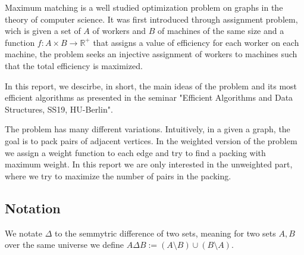 Maximum matching is a well studied optimization problem on graphs in the theory of computer science. It was first introduced through assignment problem, wich is given a set of $A$ of workers and $B$ of machines of the same size and a function $f:A\times B \rightarrow \mathbb{R}^{+}$ that assigns a value of efficiency for each worker on each machine, the problem seeks an injective assignment of workers to machines such that the total efficiency is maximized.

In this report, we descirbe, in short, the main ideas of the problem and its most efficient algorithms as presented in the seminar "Efficient Algorithms and Data Structures, SS19, HU-Berlin".

The problem has many different variations. Intuitively, in a given a graph, the goal is to pack pairs of adjacent vertices. In the weighted version of the problem we assign a weight function to each edge and try to find a packing with maximum weight. In this report we are only interested in the unweighted part, where we try to maximize the number of pairs in the packing.

\subsection{Notation}
We notate $\Delta$  to the semmytric difference of two sets, meaning for two sets $A, B$ over the same universe we define $A\Delta B := \left( A \setminus B \right) \cup \left( B \setminus A \right)$.

